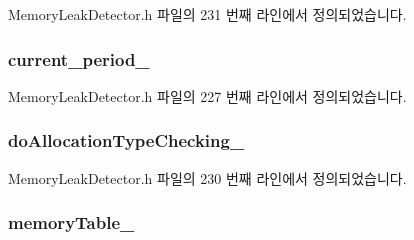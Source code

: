 Memory\+Leak\+Detector.\+h 파일의 231 번째 라인에서 정의되었습니다.

\subsubsection[{\texorpdfstring{current\+\_\+period\+\_\+}{current_period_}}]{ current\+\_\+period\+\_\+\hspace{0.3cm}{\ttfamily [private]}}\hypertarget{class_memory_leak_detector_af82b746b32f3ce3919db77a6985bab42}{}\label{class_memory_leak_detector_af82b746b32f3ce3919db77a6985bab42}


Memory\+Leak\+Detector.\+h 파일의 227 번째 라인에서 정의되었습니다.

\subsubsection[{\texorpdfstring{do\+Allocation\+Type\+Checking\+\_\+}{doAllocationTypeChecking_}}]{ do\+Allocation\+Type\+Checking\+\_\+\hspace{0.3cm}{\ttfamily [private]}}\hypertarget{class_memory_leak_detector_a9355cba4a5dcc00a72553874773d209e}{}\label{class_memory_leak_detector_a9355cba4a5dcc00a72553874773d209e}


Memory\+Leak\+Detector.\+h 파일의 230 번째 라인에서 정의되었습니다.

\subsubsection[{\texorpdfstring{memory\+Table\+\_\+}{memoryTable_}}]{ memory\+Table\+\_\+\hspace{0.3cm}{\ttfamily [private]}}\hypertarget{class_memory_leak_detector_abee17cabbc59ef23d6f51027208a100c}{}\label{class_memory_leak_detector_abee17cabbc59ef23d6f51027208a100c}


